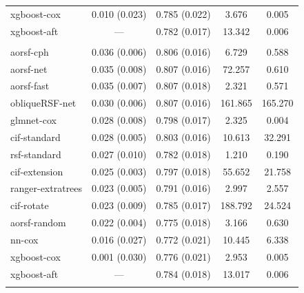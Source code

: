 \documentclass{article}\usepackage[]{graphicx}\usepackage[]{xcolor}
\newenvironment{knitrout}{}{} %
\begin{document}
\begin{knitrout}
\begin{longtable}[t]{lcccc}
\hspace{1em}xgboost-cox & 0.010 (0.023) & 0.785 (0.022) & 3.676 & 0.005\\
\hspace{1em}xgboost-aft & --- & 0.782 (0.017) & 13.342 & 0.006\\
\addlinespace[0.3em]
\multicolumn{5}{l}{\textit{\textbf{JHS; stroke, n = 3639, p = 80}}}\\
\hline
\hspace{1em}aorsf-cph & 0.036 (0.006) & 0.806 (0.016) & 6.729 & 0.588\\
\hspace{1em}aorsf-net & 0.035 (0.008) & 0.807 (0.016) & 72.257 & 0.610\\
\hspace{1em}aorsf-fast & 0.035 (0.007) & 0.807 (0.018) & 2.321 & 0.571\\
\hspace{1em}obliqueRSF-net & 0.030 (0.006) & 0.807 (0.016) & 161.865 & 165.270\\
\hspace{1em}glmnet-cox & 0.028 (0.008) & 0.798 (0.017) & 2.325 & 0.004\\
\hspace{1em}cif-standard & 0.028 (0.005) & 0.803 (0.016) & 10.613 & 32.291\\
\hspace{1em}rsf-standard & 0.027 (0.010) & 0.782 (0.018) & 1.210 & 0.190\\
\hspace{1em}cif-extension & 0.025 (0.003) & 0.797 (0.018) & 55.652 & 21.758\\
\hspace{1em}ranger-extratrees & 0.023 (0.005) & 0.791 (0.016) & 2.997 & 2.557\\
\hspace{1em}cif-rotate & 0.023 (0.009) & 0.785 (0.017) & 188.792 & 24.524\\
\hspace{1em}aorsf-random & 0.022 (0.004) & 0.775 (0.018) & 3.166 & 0.630\\
\hspace{1em}nn-cox & 0.016 (0.027) & 0.772 (0.021) & 10.445 & 6.338\\
\hspace{1em}xgboost-cox & 0.001 (0.030) & 0.776 (0.021) & 2.953 & 0.005\\
\hspace{1em}xgboost-aft & --- & 0.784 (0.018) & 13.017 & 0.006\\
\addlinespace[0.3em]

\end{longtable}
\end{knitrout}
\end{document}
